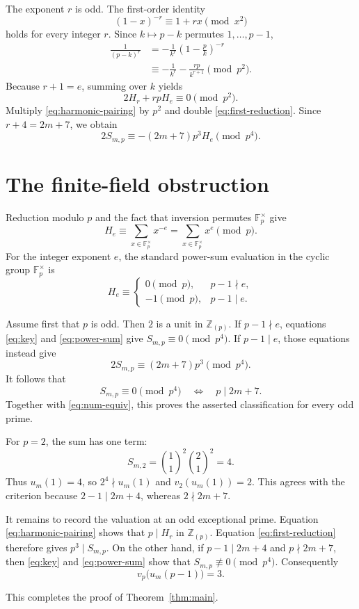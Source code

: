 \documentclass[11pt,reqno]{amsart}
\theoremstyle{remark}
\newcommand{\Fp}{\mathbb F_p}
\newcommand{\Zloc}{\mathbb Z_{(p)}}
\begin{document}
The exponent $r$ is odd.  The first-order identity
$$
 (1-x)^{-r}\equiv1+rx\pmod{x^2}
$$
holds for every integer $r$.  Since $k\mapsto p-k$ permutes
$1,\ldots,p-1$,
\begin{align*}
 \frac1{(p-k)^r}
 &=-\frac1{k^r}\left(1-\frac pk\right)^{-r}\\
 &\equiv-\frac1{k^r}-\frac{rp}{k^{r+1}}\pmod{p^2}.
\end{align*}
Because $r+1=e$, summing over $k$ yields
\begin{equation}\label{eq:harmonic-pairing}
 2H_r+rpH_e\equiv0\pmod{p^2}.
\end{equation}
Multiply \eqref{eq:harmonic-pairing} by $p^2$ and double
\eqref{eq:first-reduction}.  Since $r+4=2m+7$, we obtain
\begin{equation}\label{eq:key}
 2S_{m,p}\equiv-(2m+7)p^3H_e\pmod{p^4}.
\end{equation}

\section{The finite-field obstruction}

Reduction modulo $p$ and the fact that inversion permutes
$\Fp^\times$ give
$$
 H_e\equiv\sum_{x\in\Fp^\times}x^{-e}
 =\sum_{x\in\Fp^\times}x^e\pmod p.
$$
For the integer exponent $e$, the standard power-sum evaluation in the
cyclic group
$\Fp^\times$ is
\begin{equation}\label{eq:power-sum}
 H_e\equiv
 \begin{cases}
  0\pmod p,&p-1\nmid e,\\
  -1\pmod p,&p-1\mid e.
 \end{cases}
\end{equation}

Assume first that $p$ is odd.  Then $2$ is a unit in $\Zloc$.  If
$p-1\nmid e$, equations \eqref{eq:key} and \eqref{eq:power-sum} give
$S_{m,p}\equiv0\pmod{p^4}$.  If $p-1\mid e$, those equations instead
give
$$
 2S_{m,p}\equiv(2m+7)p^3\pmod{p^4}.
$$
It follows that
$$
 S_{m,p}\equiv0\pmod{p^4}
 \quad\Longleftrightarrow\quad
 p\mid2m+7.
$$
Together with \eqref{eq:num-equiv}, this proves the asserted
classification for every odd prime.

For $p=2$, the sum has one term:
$$
 S_{m,2}=\binom11^2\binom21^2=4.
$$
Thus $u_m(1)=4$, so $2^4\nmid u_m(1)$ and
$v_2(u_m(1))=2$.  This agrees with the criterion because
$2-1\mid2m+4$, whereas $2\nmid2m+7$.

It remains to record the valuation at an odd exceptional prime.
Equation \eqref{eq:harmonic-pairing} shows that $p\mid H_r$ in
$\Zloc$.  Equation \eqref{eq:first-reduction} therefore gives
$p^3\mid S_{m,p}$.  On the other hand, if
$p-1\mid2m+4$ and $p\nmid2m+7$, then \eqref{eq:key} and
\eqref{eq:power-sum} show that $S_{m,p}\not\equiv0\pmod{p^4}$.
Consequently
$$
 v_p\bigl(u_m(p-1)\bigr)=3.
$$

This completes the proof of Theorem~\ref{thm:main}.
\end{document}
